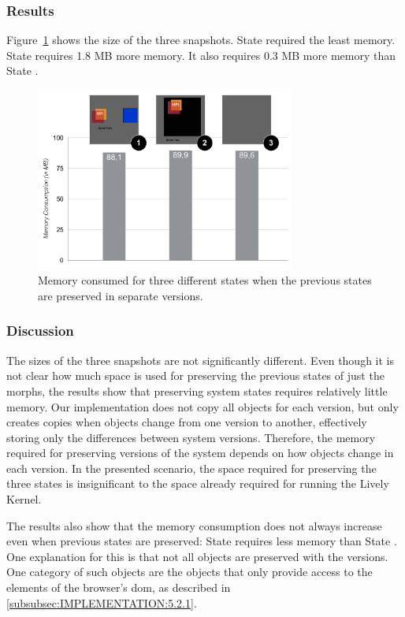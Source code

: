 \subsubsection{Results}
Figure~\ref{fig:MemoryOverheadForVersions} shows the size of the three snapshots.
State  required the least memory.
State  requires 1.8 MB more memory.
It also requires 0.3 MB more memory than State .

\begin{figure}[h!]
    \centering
    \includegraphics[width=0.76\textwidth]{figures/6_evaluation/2_memoryForVersions.pdf}
    \caption{Memory consumed for three different states when the previous states are preserved in separate versions.}
    \label{fig:MemoryOverheadForVersions}
\end{figure}

\subsubsection{Discussion}

The sizes of the three snapshots are not significantly different.
Even though it is not clear how much space is used for preserving the previous states of just the morphs, the results show that preserving system states requires relatively little memory.
Our implementation does not copy all objects for each version, but only creates copies when objects change from one version to another, effectively storing only the differences between system versions.
Therefore, the memory required for preserving versions of the system depends on how objects change in each version.
In the presented scenario, the space required for preserving the three states is insignificant to the space already required for running the Lively Kernel.

The results also show that the memory consumption does not always increase even when previous states are preserved: State  requires less memory than State .
One explanation for this is that not all objects are preserved with the versions.
One category of such objects are the objects that only provide access to the elements of the browser's \ac{dom}, as described in \ref{subsubsec:IMPLEMENTATION:5.2.1}.


